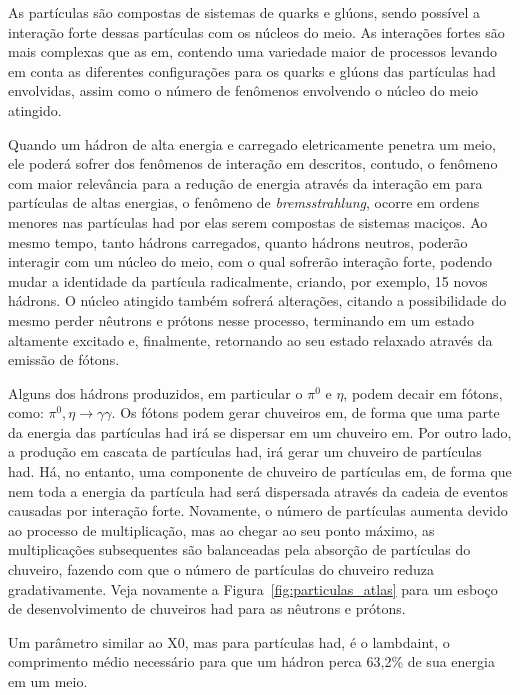 As partículas  são compostas de sistemas de quarks 
e glúons, sendo possível a interação forte dessas partículas com os núcleos do meio. 
As interações fortes são mais complexas que as \gls{em}, contendo uma variedade maior de
processos levando em conta as diferentes configurações para os quarks e glúons
das partículas \gls{had} envolvidas, assim como o número de fenômenos envolvendo o 
núcleo do meio atingido.

Quando um hádron de alta energia e carregado eletricamente penetra um meio, 
ele poderá sofrer dos fenômenos de interação \gls{em} descritos, contudo,
o fenômeno com maior relevância para a redução de energia através da interação
\gls{em} para partículas de altas energias, o
fenômeno de \emph{bremsstrahlung}, ocorre em ordens menores nas partículas
\gls{had} por elas serem compostas de sistemas maciços. Ao mesmo tempo, 
tanto hádrons carregados, quanto hádrons neutros, poderão interagir com um
núcleo do meio, com o qual sofrerão interação forte, podendo mudar a identidade 
da partícula radicalmente, criando, por exemplo, 15 novos hádrons. O núcleo atingido também sofrerá
alterações, citando a possibilidade do mesmo perder nêutrons e prótons nesse
processo, terminando em um estado altamente excitado e, finalmente, retornando
ao seu estado relaxado através da emissão de fótons.

Alguns dos hádrons produzidos, em particular o $\pi^0$ e $\eta$, 
podem decair em fótons, como: $\pi^0,\eta\rightarrow\gamma\gamma$. 
Os fótons podem gerar chuveiros \gls{em}, de forma que uma parte da energia das partículas
\gls{had} irá se dispersar em um chuveiro \gls{em}. Por outro lado, a 
produção em cascata de partículas \gls{had}, irá gerar um chuveiro de partículas 
\gls{had}. Há, no entanto, uma componente de chuveiro de partículas \gls{em}, 
de forma que nem toda a energia da partícula \gls{had} 
será dispersada através da cadeia de eventos causadas por interação forte. 
Novamente, o número de partículas aumenta 
devido ao processo de multiplicação, mas
ao chegar ao seu ponto máximo, as multiplicações subsequentes são
balanceadas pela absorção de partículas do chuveiro, fazendo com que o número de
partículas do chuveiro reduza gradativamente. Veja novamente a
Figura~\ref{fig:particulas_atlas} para um esboço de desenvolvimento de chuveiros
\gls{had} para as nêutrons e prótons.


Um parâmetro similar ao \gls{X0}, mas para partículas \gls{had}, é o \gls{lambdaint},
o comprimento médio necessário para que um hádron perca 63,2\% de sua
energia em um meio. 

